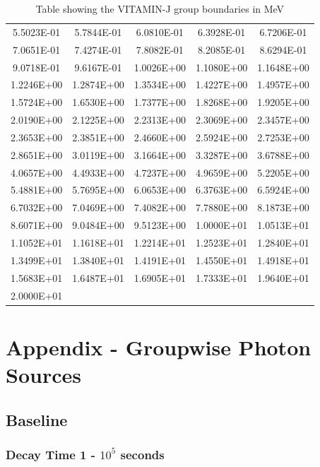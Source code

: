 \documentclass[12pt]{article}
\begin{document}
\begin{centering}
\begin{table}[ht!]
\begin{tabular}{| c  c  c  c  c |}
  5.5023E-01 & 5.7844E-01 & 6.0810E-01 & 6.3928E-01 & 6.7206E-01\\
  7.0651E-01 & 7.4274E-01 & 7.8082E-01 & 8.2085E-01 & 8.6294E-01\\
  9.0718E-01 & 9.6167E-01 & 1.0026E+00 & 1.1080E+00 & 1.1648E+00\\
  1.2246E+00 & 1.2874E+00 & 1.3534E+00 & 1.4227E+00 & 1.4957E+00\\
  1.5724E+00 & 1.6530E+00 & 1.7377E+00 & 1.8268E+00 & 1.9205E+00\\
  2.0190E+00 & 2.1225E+00 & 2.2313E+00 & 2.3069E+00 & 2.3457E+00\\
  2.3653E+00 & 2.3851E+00 & 2.4660E+00 & 2.5924E+00 & 2.7253E+00\\
  2.8651E+00 & 3.0119E+00 & 3.1664E+00 & 3.3287E+00 & 3.6788E+00\\
  4.0657E+00 & 4.4933E+00 & 4.7237E+00 & 4.9659E+00 & 5.2205E+00\\
  5.4881E+00 & 5.7695E+00 & 6.0653E+00 & 6.3763E+00 & 6.5924E+00\\
  6.7032E+00 & 7.0469E+00 & 7.4082E+00 & 7.7880E+00 & 8.1873E+00\\
  8.6071E+00 & 9.0484E+00 & 9.5123E+00 & 1.0000E+01 & 1.0513E+01\\
  1.1052E+01 & 1.1618E+01 & 1.2214E+01 & 1.2523E+01 & 1.2840E+01\\
  1.3499E+01 & 1.3840E+01 & 1.4191E+01 & 1.4550E+01 & 1.4918E+01\\
  1.5683E+01 & 1.6487E+01 & 1.6905E+01 & 1.7333E+01 & 1.9640E+01\\
  2.0000E+01 & & & & \\ 
  \hline
\end{tabular}
\caption{Table showing the VITAMIN-J group boundaries in MeV}
\label{tab:vitamin_j}
\end{table}
\end{centering}

\newpage
\clearpage
\section{Appendix - Groupwise Photon Sources}
\subsection{Baseline}
\label{appendix:grp_photon_src_baseline}
\subsubsection{Decay Time 1 - $10^{5}$ seconds}

\end{document}
